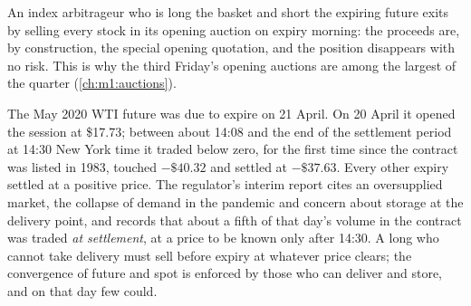 \begin{omfigure}

\label{fig:m1:basis-roll-and-delivery:expiry}
\end{omfigure}

An index arbitrageur who is long the basket and short the expiring future
exits by selling every stock in its opening auction on expiry morning: the
proceeds are, by construction, the special opening quotation, and the
position disappears with no  risk. This is why the third Friday's
opening auctions are among the largest of the quarter
(\cref{ch:m1:auctions}).

\begin{example}\label{ex:m1:basis-roll-and-delivery:wti}
The May 2020 WTI future was due to expire on 21 April. On 20 April it opened
the session at \$17.73; between about 14:08 and the end of the settlement
period at 14:30 New York time it traded below zero, for the first time since
the contract was listed in 1983, touched $-\$40.32$ and settled at
$-\$37.63$. Every other expiry settled at a positive price. The regulator's
interim report cites an oversupplied market, the collapse of demand in the
pandemic and concern about storage at the delivery point, and records that
about a fifth of that day's volume in the contract was traded \emph{at
settlement}, at a price to be known only after 14:30. A long who cannot take
delivery must sell before expiry at whatever price clears; the convergence
of future and spot is enforced by those who can deliver and store, and on
that day few could.
\end{example}

